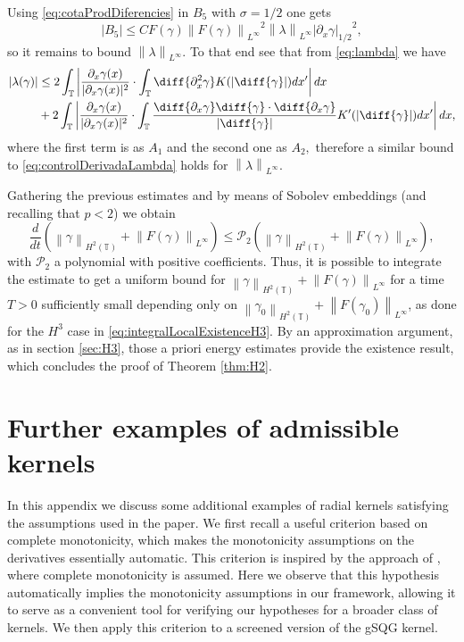\documentclass[a4paper]{amsart}
\theoremstyle{definition}
\newcommand{\T}{\ensuremath{\mathbb{T}}}
\newcommand{\SNa}[2][\gamma]{\ensuremath{\left|#2\right|_{#1}}}
\newcommand{\Np}[2][\infty]{\ensuremath{\left\|#2\right\|_{L^#1}}}
\newcommand{\Hd}[1]{\ensuremath{\left\|#1\right\|_{H^2(\T)}}}
\newcommand{\intT}{\ensuremath{\int_\T}}
\begin{document}
        Using \eqref{eq:cotaProdDiferencies} in $B_5$ with $\sigma=1/2$ one gets $$|B_5|\leq C F(\gamma) \Np{F(\gamma)}^2 \Np{\lambda} \SNa[1/2]{\partial_x\gamma}^2,$$ so it remains to bound $\Np{\lambda}.$ To that end see that from \eqref{eq:lambda} we have
        \begin{align*}
            |\lambda(\gamma)|&\leq 2 \intT \left|\frac{\partial_x\gamma(x)}{|\partial_x\gamma(x)|^2} \cdot \intT \diff{\partial_x^2\gamma} K(|\diff{\gamma}|) dx'\right| dx \\&+ 2 \intT \left|\frac{\partial_x\gamma(x)}{|\partial_x\gamma(x)|^2} \cdot \intT \frac{\diff{\partial_x\gamma} \diff{\gamma} \cdot \diff{\partial_ x\gamma}}{|\diff{\gamma}|}K'(|\diff{\gamma}|) dx'\right| dx,
        \end{align*}
        where the first term is as $A_1$ and the second one as $A_2,$ therefore a similar bound to \eqref{eq:controlDerivadaLambda} holds for $\Np{\lambda}.$

        Gathering the previous estimates and by means of Sobolev embeddings (and recalling that $p<2$) we obtain 
        $$\frac{d}{dt}(\Hd{\gamma}+\Np{F(\gamma)})\leq \mathcal{P}_2(\Hd{\gamma}+\Np{F(\gamma)}),$$ 
        with $\mathcal{P}_2$ a polynomial with positive coefficients. Thus, it is possible to integrate the estimate to get a uniform bound for $\Hd{\gamma}+\Np{F(\gamma)}$ for a time $T>0$ sufficiently small depending only on $\Hd{\gamma_0}+\Np{F(\gamma_0)}$, as done for the $H^3$ case in \eqref{eq:integralLocalExistenceH3}. By an approximation argument, as in section \ref{sec:H3}, those a priori energy estimates provide the existence result, which concludes the proof of Theorem \ref{thm:H2}.


        \appendix

\section{Further examples of admissible kernels}\label{app:examples}
In this appendix we discuss some additional examples of radial kernels satisfying the assumptions used in the paper. We first recall a useful criterion based on complete monotonicity, which makes the monotonicity assumptions on the derivatives essentially automatic. This criterion is inspired by the approach of \cite{hmidi2023unifiedtheoryvstatesstructures}, where complete monotonicity is assumed. Here we observe that this hypothesis automatically implies the monotonicity assumptions in our framework, allowing it to serve as a convenient tool for verifying our hypotheses for a broader class of kernels. We then apply this criterion to a screened version of the gSQG kernel.
\end{document}
